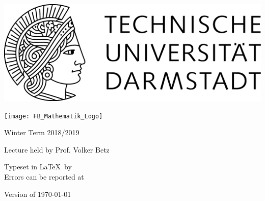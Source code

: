 \makeatletter
\begin{titlepage}
\recalctypearea
\centering

	\includegraphics[width=0.5\linewidth]{TU_Darmstadt_Logo}

\vspace{1cm}

	\texttt{[image: FB\_Mathematik\_Logo]}

\vspace{3.5cm}

	{\Huge{} \@title}

\vspace{0.5cm}

	{ Winter Term 2018/2019}

\vspace{0.5cm}

	{ Lecture held by Prof. Volker Betz}

\vspace{1.0cm}

	\begingroup
	\small
	Typeset in \LaTeX\ by \@author\\
	Errors can be reported at 
	\endgroup

\vfill

	{\small Version of \today}
\end{titlepage}
\makeatother
